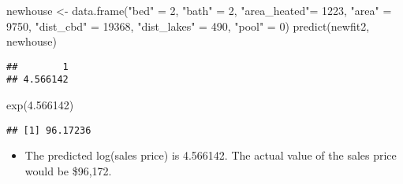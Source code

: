 \documentclass[
]{article}
\newenvironment{Shaded}{\begin{snugshade}}{\end{snugshade}}
\newcommand{\DecValTok}[1]{\textcolor[rgb]{0.00,0.00,0.81}{#1}}
\newcommand{\FloatTok}[1]{\textcolor[rgb]{0.00,0.00,0.81}{#1}}
\newcommand{\FunctionTok}[1]{\textcolor[rgb]{0.00,0.00,0.00}{#1}}
\newcommand{\NormalTok}[1]{#1}
\newcommand{\OtherTok}[1]{\textcolor[rgb]{0.56,0.35,0.01}{#1}}
\newcommand{\StringTok}[1]{\textcolor[rgb]{0.31,0.60,0.02}{#1}}
\providecommand{\tightlist}{%
  \setlength{\itemsep}{0pt}\setlength{\parskip}{0pt}}
\begin{document}
\begin{Shaded}
\begin{Highlighting}[]
\NormalTok{newhouse }\OtherTok{\textless{}{-}} \FunctionTok{data.frame}\NormalTok{(}\StringTok{"bed"} \OtherTok{=} \DecValTok{2}\NormalTok{,}
                       \StringTok{"bath"} \OtherTok{=} \DecValTok{2}\NormalTok{,}
                       \StringTok{"area\_heated"}\OtherTok{=} \DecValTok{1223}\NormalTok{,}
                       \StringTok{"area"} \OtherTok{=} \DecValTok{9750}\NormalTok{,}
                       \StringTok{"dist\_cbd"} \OtherTok{=} \DecValTok{19368}\NormalTok{,}
                       \StringTok{"dist\_lakes"} \OtherTok{=} \DecValTok{490}\NormalTok{,}
                       \StringTok{"pool"} \OtherTok{=} \DecValTok{0}\NormalTok{)}
\FunctionTok{predict}\NormalTok{(newfit2, newhouse)}
\end{Highlighting}
\end{Shaded}

\begin{verbatim}
##        1 
## 4.566142
\end{verbatim}

\begin{Shaded}
\begin{Highlighting}[]
\FunctionTok{exp}\NormalTok{(}\FloatTok{4.566142}\NormalTok{)}
\end{Highlighting}
\end{Shaded}

\begin{verbatim}
## [1] 96.17236
\end{verbatim}

\begin{itemize}
\tightlist
\item
  The predicted log(sales price) is 4.566142. The actual value of the
  sales price would be \$96,172.
\end{itemize}
\end{document}
